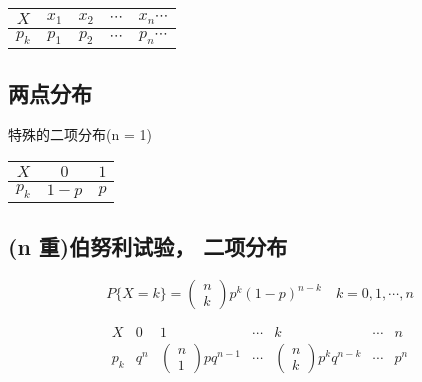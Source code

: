 \begin{center}
    \begin{tabular}{|c|c|c|c|c|}
    \hline $ {X} $ & $ {x}_{1} $ & $ {x}_{2} $ & $ \cdots $ & $ {x}_{n} \cdots $ \\
    \hline $ {p}_{k} $ & $ {p}_{1} $ & $ {p}_{2} $ & $ \cdots $ & $ {p}_{n} \cdots $ \\
    \hline
    \end{tabular}
\end{center}


\subsection{两点分布}

特殊的二项分布(n = 1)
\begin{center}
   \begin{tabular}{|c|c|c|}
    \hline $ {X} $ & $0$ & $1 $\\
    \hline$ p_{k} $ & $ 1-{p} $ & $ {p} $ \\
    \hline
    \end{tabular}

\subsection{(n 重)伯努利试验， 二项分布} 
\end{center}


\begin{equation}
P\{X=k\}=\left(\begin{array}{l}
n \\
k
\end{array}\right) p^{k}(1-p)^{n-k} \quad k=0,1, \cdots, n
\end{equation}

\begin{equation}
\begin{array}{c|cccccc}
{X} & {0} & {1} & \cdots & {k} & \cdots & {n} \\
\hline {p}_{{k}} & {q}^{n} & \left(\begin{array}{l}
{n} \\
{1}
\end{array}\right) {p q}^{n-1} & \cdots & \left(\begin{array}{l}
{n} \\
{k}
\end{array}\right) {p}^{k} {q}^{n-k} & \cdots & {p}^{n}
\end{array}
\end{equation}

